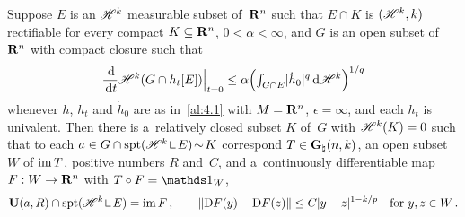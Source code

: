 \begin{corollary}
    \label{al:8.1(3)}
    Suppose $E$ is an $\mathscr{H}^{k}$ measurable subset of~$\mathbf{R}^{n}$ such that $E \cap K$ is
    $(\mathscr{H}^{k},k)$ rectifiable for every compact $K \subseteq \mathbf{R}^{n}$, $0 < \alpha <
    \infty$, and $G$ is an open subset of~$\mathbf{R}^{n}$ with compact closure such that
    \begin{displaymath}
        \frac{\,\mathrm{d}}{\,\mathrm{d} t} \mathscr{H}^{k}(G \cap h_t[E]) \Big|_{t=0} \le \alpha \Big( {\textstyle\int_{G \cap
        E}^{}} |\dot h_0|^q \,\mathrm{d} \mathscr{H}^{k} \Big)^{1/q}
    \end{displaymath}
    whenever $h$, $h_t$ and $\dot h_0$ are as in~\ref{al:4.1} with $M = \mathbf{R}^{n}$, $\epsilon =
    \infty$, and each $h_t$ is univalent. Then there is a~relatively closed subset $K$ of~$G$ with
    $\mathscr{H}^{k}(K) = 0$ such that to each $a \in G \cap \spt(\HM^{\vdim} \restrict E) \without K$
    correspond $T \in \mathbf{G}_{\natural}(n,k)$, an open subset $W$ of $\operatorname{im} T$, positive numbers $R$
    and~$C$, and a~continuously differentiable map $F : W \to \mathbf{R}^{n}$ with $T \circ F =
    \id{W}$,
    \begin{displaymath}
        \oball{a}{R} \cap \spt(\HM^{\vdim} \restrict E) = \im F \,, \qquad \|\uD F(y) - \uD F(z)\|
        \le C |y - z|^{1 - \vdim/p} \quad \text{for $y, z \in W$} \,.
    \end{displaymath}
\end{corollary}

